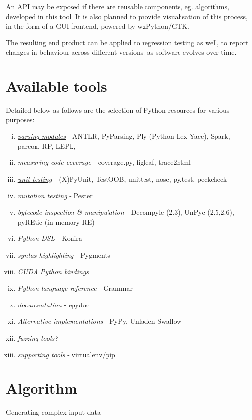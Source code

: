 \documentclass{icldt}
\numberwithin{equation}{section}       %
\begin{document}
{An API may be exposed if there are reusable components, eg. algorithms, developed in this tool. It is also planned to provide visualisation of this process, in the form of a GUI frontend, powered by wxPython/GTK.

The resulting end product can be applied to regression testing as well, to report changes in behaviour across different versions, as software evolves over time.

\section*{Available tools}
Detailed below as follows are the selection of Python resources for various purposes:
\begin{enumerate}[i.]
	\item \emph{\href{http://wiki.python.org/moin/LanguageParsing}{parsing modules}} - ANTLR, PyParsing, Ply (Python Lex-Yacc), Spark, parcon, RP, LEPL, 
	\item \emph{measuring code coverage} - coverage.py, figleaf, trace2html
	\item \emph{\href{http://wiki.python.org/moin/PythonTestingToolsTaxonomy}{unit testing}} - (X)PyUnit, TestOOB, unittest, nose, py.test, peckcheck
	\item \emph{mutation testing} - Pester
	\item \emph{bytecode inspection \& manipulation} - Decompyle (2.3), UnPyc (2.5,2.6), pyREtic (in memory RE)
	\item \emph{Python DSL} - Konira
	\item \emph{syntax highlighting} - Pygments
	\item \emph{CUDA Python bindings}
	\item \emph{Python language reference} - Grammar
	\item \emph{documentation} - epydoc
	\item \emph{Alternative implementations} - PyPy, Unladen Swallow
	\item \emph{fuzzing tools?}
	\item \emph{supporting tools} - virtualenv/pip
\end{enumerate}
\section{Algorithm}

Generating complex input data

}
\end{document}
